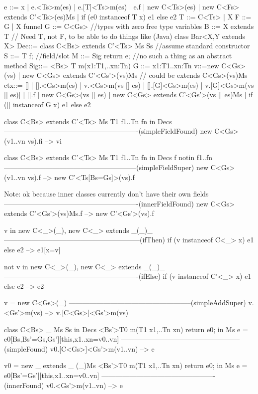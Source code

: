 e ::= x | e.<Ts>m(es) | e.[T]<Ts>m(es) | e.f | new C<Ts>(es) 
   | new C<Fs> extends C'<Ts>(es){Ms} 
   | if (e0 instanceof T x){ e1 } else { e2 }
T ::= C<Ts> | X
F ::= G | X funnel
G ::= C<Gs> //types with zero free type variables
B ::=  X extends T
// Need T, not F, to be able to do things like (Java) class Bar<X,Y extends X> {}
Dec::= class C<Bs> extends C'<Ts>{ Ms Ss} //assume standard constructor
S ::= T f; //field/slot
M ::= Sig{ return e; }  //no such a thing as an abstract method
Sig::= <Bs> T m(x1:T1,..xn:Tn)
G ::= x1:T1..xn:Tn
v::=new C<Gs>(vs) | new C<Gs> extends C'<Gs'>(vs){Ms} // could be extends C<Gs>(vs){Ms}
ctx::= [] 
   | [].<Gs>m(es) | v.<Gs>m(vs [] es)
   | [].[G]<Gs>m(es) | v.[G]<Gs>m(vs [] es)|
   | [].f | new C<Gs>(vs [] es) 
   | new C<Gs> extends C'<Gs'>(vs [] es){Ms} 
   | if ([] instanceof G x){ e1 } else { e2 }


   class C<Bs> extends C'<Ts>{ Ms T1 f1..Tn fn} in Decs
----------------------------------------------------------(simpleFieldFound)
   new C<Gs>(v1..vn vs).fi --> vi

   class C<Bs> extends C'<Ts>{ Ms T1 f1..Tn fn} in Decs
   f notin {f1..fn}
---------------------------------------------------------(simpleFieldSuper)
   new C<Gs>(v1..vn vs).f --> new C'<Ts[Bs=Gs]>(vs).f

Note: ok because inner classes currently don't have their own fields
----------------------------------------------------------(innerFieldFound)
   new C<Gs> extends C'<Gs'>(vs){Ms}.f --> new C'<Gs'>(vs).f

  v in { new C<_>(_), new C<_> extends _(_){_} }
-----------------------------------------------------------(ifThen)
  if (v instanceof C<_> x){ e1 } else { e2 } --> e1[x=v]

  not v in { new C<_>(_), new C<_> extends _(_){_} }
----------------------------------------------------------(ifElse)
  if (v instanceof C'<_> x){ e1 } else { e2 } --> e2

   v = new C<Gs>(_)
-----------------------------------------------------(simpleAddSuper)
   v.<Gs'>m(vs) --> v.[C<Gs>]<Gs'>m(vs)

   class C<Bs> _ { Ms Ss} in Decs
   <Bs'>T0 m(T1 x1,..Tn xn){ return e0; } in Ms
   e = e0[Bs,Bs'=Gs,Gs'][this,x1..xn=v0..vn]
---------------------------------------------------(simpleFound)
   v0.[C<Gs>]<Gs'>m(v1..vn) --> e

   v0 = new _ extends _ (_){Ms}
   <Bs'>T0 m(T1 x1,..Tn xn){ return e0; } in Ms
   e = e0[Bs'=Gs'][this,x1..xn=v0..vn]
-------------------------------------------------(innerFound)
   v0.<Gs'>m(v1..vn) --> e

